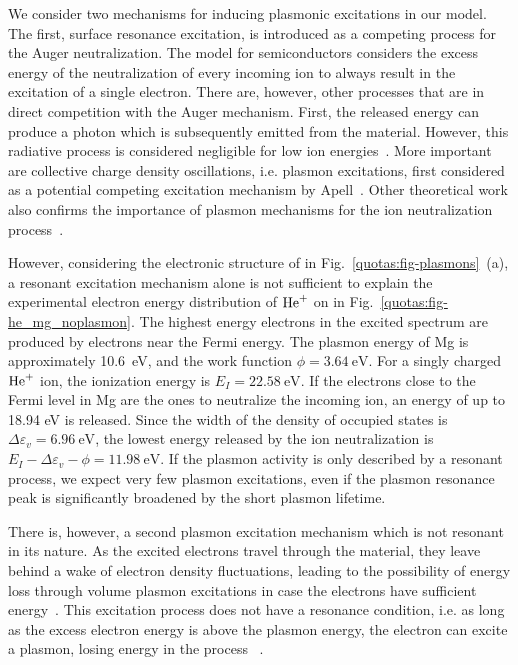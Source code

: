 \begin{refsection}
We consider two mechanisms for inducing plasmonic excitations in our model. 
The first, surface resonance excitation, is introduced as a competing process 
for the Auger neutralization. The model for semiconductors 
considers the excess energy of the neutralization of every incoming ion to always
result in the excitation of a single electron. There are, however, other 
processes that are in direct competition with the Auger mechanism. First, the 
released energy can produce a photon which is subsequently emitted from the 
material. However, this radiative process is considered negligible for low ion 
energies~\cite{Almulhem1989}. More important are collective charge density 
oscillations, i.e. plasmon excitations, first considered as a potential competing 
excitation mechanism by Apell~\cite{Apell1988}. Other theoretical 
work also confirms the importance of plasmon mechanisms for the ion 
neutralization process~\cite{Almulhem1989, Monreal1995, VicenteAlvarez1998}.  

However, considering the electronic structure of  in Fig.~\ref{quotas:fig-plasmons}~(a), a resonant 
excitation mechanism alone is not sufficient to explain the experimental 
electron energy distribution of $\ce{He^+}$ on  in 
Fig.~\ref{quotas:fig-he_mg_noplasmon}. The highest energy electrons in the 
excited spectrum are produced by electrons near the Fermi energy. The plasmon 
energy of Mg is approximately 10.6~\si{\electronvolt}, and the work function 
$\phi = 3.64~\si{\electronvolt}$. For a singly charged $\ce{He^+}$ 
ion, the ionization energy is $E_I = 22.58~\si{\electronvolt}$. If the electrons close 
to the Fermi level in Mg are the ones to neutralize the incoming ion, an 
energy of up to 18.94 eV is released. Since the width of the density of 
occupied states is $\Delta \varepsilon_{v} = 6.96~\si{\electronvolt}$, the 
lowest energy released by the ion neutralization is $E_I - \Delta\varepsilon_{v} - \phi = 11.98~\si{\electronvolt}$. 
If the plasmon activity is only described by a resonant 
process, we expect very few plasmon excitations, even if the plasmon 
resonance peak is significantly broadened by the short plasmon lifetime.

There is, however, a second plasmon excitation mechanism which is not 
resonant in its nature. As the excited electrons travel through the material, 
they leave behind a wake of electron density fluctuations, leading to the 
possibility of energy loss through volume plasmon excitations in case the 
electrons have sufficient energy~\cite{Ritchie1957}. This excitation process does not have a 
resonance condition, i.e. as long as the excess electron energy is above the 
plasmon energy, the electron can excite a plasmon, losing energy in the process 
~\cite{Baragiola2001}.


\end{refsection}

